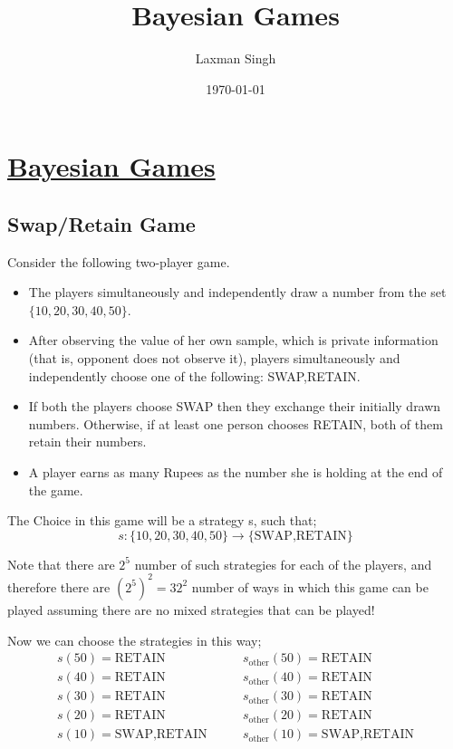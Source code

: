 \documentclass[12pt,a4paper]{article}
\author{Laxman Singh}
\date{\today}
\title{Bayesian Games}
\begin{document}
\section{\underline{Bayesian Games}}
\subsection{Swap/Retain Game}

Consider the following two-player game.
\begin{itemize}
\item The players simultaneously and independently draw a number from the set \(\{10,20,30,40,50\}\).

\item After observing the value of her own sample, which is private information (that is, opponent does not observe it), players simultaneously and independently choose one of the following: 
SWAP,RETAIN.

\item If both the players choose SWAP then they exchange their initially drawn numbers. Otherwise, if at least one person chooses RETAIN, both of them retain their numbers.

\item A player earns as many Rupees as the number she is holding at the end of the game.
\end{itemize}
 
The Choice in this game will be a strategy s, such that;
\begin{equation*}
    s:\{10,20,30,40,50\} \rightarrow \{\text{SWAP,RETAIN}\}
\end{equation*}    

Note that there are \(2^5\) number of such strategies for each of the players, and therefore there are \((2^5)^2=32^2\) number of ways in which this game can be played assuming there are no mixed strategies that can be played!

Now we can choose the strategies in this way;
 \begin{align*}
    s(50)= \text{RETAIN} & \qquad s_{\text{other}}(50)=\text{RETAIN}\\
    s(40)= \text{RETAIN} & \qquad s_{\text{other}}(40)=\text{RETAIN}\\
    s(30)= \text{RETAIN} & \qquad s_{\text{other}}(30)=\text{RETAIN}\\
    s(20)= \text{RETAIN} & \qquad s_{\text{other}}(20)=\text{RETAIN}\\
    s(10)= \text{SWAP,RETAIN} & \qquad s_{\text{other}}(10)=\text{SWAP,RETAIN}\\
\end{align*}
\end{document}
